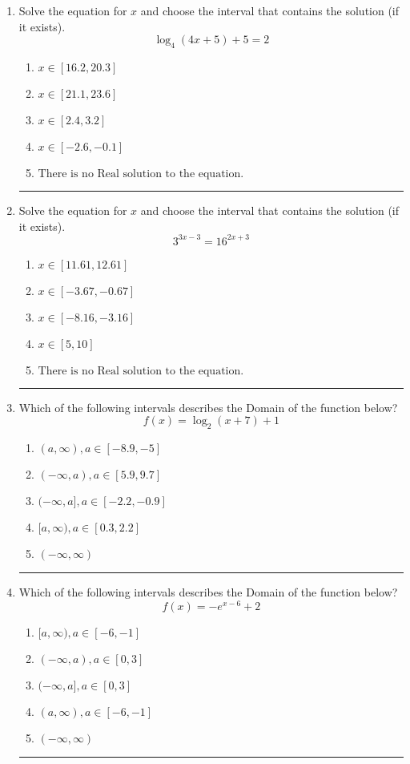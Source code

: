 \documentclass[14pt]{extbook}
\newcommand{\litem}[1]{\item#1\hspace*{-1cm}\rule{\textwidth}{0.4pt}}
\begin{document}
\begin{enumerate}
{\begin{enumerate}[label=\Alph*.]
\end{enumerate} }
\litem{
Solve the equation for $x$ and choose the interval that contains the solution (if it exists).\[ \log_{4}{(4x+5)}+5 = 2 \]\begin{enumerate}[label=\Alph*.]
\item \( x \in [16.2, 20.3] \)
\item \( x \in [21.1, 23.6] \)
\item \( x \in [2.4, 3.2] \)
\item \( x \in [-2.6, -0.1] \)
\item \( \text{There is no Real solution to the equation.} \)

\end{enumerate} }
\litem{
Solve the equation for $x$ and choose the interval that contains the solution (if it exists).\[ 3^{3x-3} = 16^{2x+3} \]\begin{enumerate}[label=\Alph*.]
\item \( x \in [11.61, 12.61] \)
\item \( x \in [-3.67, -0.67] \)
\item \( x \in [-8.16, -3.16] \)
\item \( x \in [5, 10] \)
\item \( \text{There is no Real solution to the equation.} \)

\end{enumerate} }
\litem{
Which of the following intervals describes the Domain of the function below?\[ f(x) = \log_2{(x+7)}+1 \]\begin{enumerate}[label=\Alph*.]
\item \( (a, \infty), a \in [-8.9, -5] \)
\item \( (-\infty, a), a \in [5.9, 9.7] \)
\item \( (-\infty, a], a \in [-2.2, -0.9] \)
\item \( [a, \infty), a \in [0.3, 2.2] \)
\item \( (-\infty, \infty) \)

\end{enumerate} }
\litem{
Which of the following intervals describes the Domain of the function below?\[ f(x) = -e^{x-6}+2 \]\begin{enumerate}[label=\Alph*.]
\item \( [a, \infty), a \in [-6, -1] \)
\item \( (-\infty, a), a \in [0, 3] \)
\item \( (-\infty, a], a \in [0, 3] \)
\item \( (a, \infty), a \in [-6, -1] \)
\item \( (-\infty, \infty) \)


\end{enumerate}}
\end{enumerate}
\end{document}
